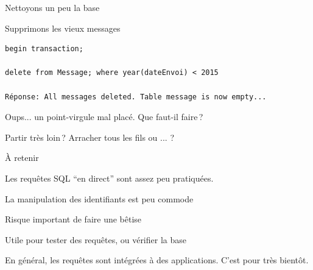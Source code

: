 \begin{frame}[fragile]{Nettoyons un peu la base}

Supprimons les vieux messages

\begin{verbatim}
begin transaction;

delete from Message; where year(dateEnvoi) < 2015

Réponse: All messages deleted. Table message is now empty...
\end{verbatim}


\vfill
Oups... un point-virgule mal placé. \alert{Que faut-il faire\,?}

\vfill

Partir très loin\,? Arracher tous les fils\? ou ... ?

\end{frame}
\begin{frame}{À retenir}

Les requêtes SQL ``en direct'' sont assez peu pratiquées.

\vfill

\begin{redbullet}
  \item La manipulation des identifiants est peu commode
  \item Risque important de faire une bêtise
  \item \alert{Utile pour tester des requêtes, ou vérifier la base}
\end{redbullet}

\vfill

En général, les requêtes sont intégrées à des applications. C'est
pour très bientôt.
\end{frame}

